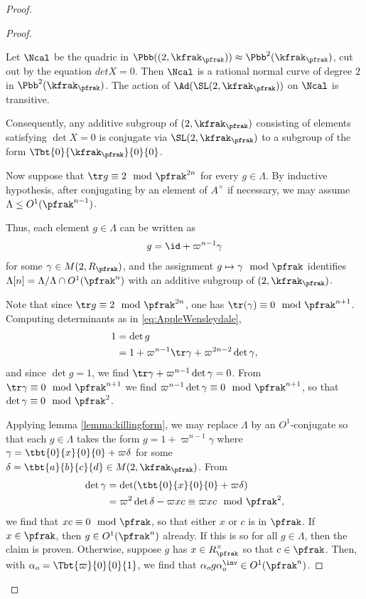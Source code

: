 \begin{proof}
\begin{proof}
  \begin{lemma}\label{lemma:killingform}
    Let $\Ncal$ be the quadric in $\Pbb(\sl(2,\kfrak_\pfrak))\approx \Pbb^2(\kfrak_\pfrak)$, cut out by the equation $det X =0$. Then $\Ncal$ is a rational normal curve of degree $2$ in $\Pbb^2(\kfrak_\pfrak)$. The action of $\Ad(\SL(2,\kfrak_\pfrak))$ on $\Ncal$ is transitive.

    Consequently, any additive subgroup of $\sl(2,\kfrak_\pfrak)$ consisting of elements satisfying $\det X = 0$ is conjugate via $\SL(2,\kfrak_\pfrak)$ to a subgroup of the form $\Tbt{0}{\kfrak_\pfrak}{0}{0}$.
  \end{lemma}
  Now suppose that $\tr g \equiv 2 \mod \pfrak^{2n}$ for every $g\in \Lambda$. By inductive hypothesis, after conjugating by an element of $A^\times$ if necessary, we may assume $\Lambda \leq O^1(\pfrak^{n-1})$.

  Thus, each element $g\in \Lambda$ can be written as
  \begin{align}\label{eq:AppleWensleydale}
    g = \id +\varpi^{n-1} \gamma
  \end{align}
  for some $\gamma \in M(2, R_\pfrak)$, and the assignment $g \mapsto \gamma \mod \pfrak$ identifies $\Lambda[n] = \Lambda /\Lambda \cap O^1(\pfrak^n)$ with an additive subgroup of $\sl(2,\kfrak_\pfrak)$.

  Note that since $\tr g \equiv 2 \mod \pfrak^{2n}$, one has $\tr(\gamma) \equiv 0 \mod \pfrak^{n+1}$.
  Computing determinants as in \ref{eq:AppleWensleydale},
  \begin{align*}
    1 & = \det g                                                  \\
      & = 1 + \varpi^{n-1} \tr \gamma + \varpi^{2n-2}\det \gamma,
  \end{align*}
  and since $\det g =1$, we find $\tr \gamma +\varpi^{n-1}\det \gamma =0$. From $\tr \gamma  \equiv 0 \mod \pfrak^{n+1}$ we find $ \varpi^{n-1}\det \gamma \equiv 0 \mod \pfrak^{n+1}$, so that $\det \gamma \equiv 0 \mod \pfrak^2$.

  Applying lemma \ref{lemma:killingform}, we may replace $\Lambda$ by an $O^1$-conjugate so that each $g \in \Lambda$ takes the form $g = 1 + \varpi^{n-1}\gamma$ where $\gamma = \tbt{0}{x}{0}{0} +\varpi\delta$ for some $\delta =\tbt{a}{b}{c}{d} \in M(2,\kfrak_\pfrak)$. From
  \begin{align*}
    \det \gamma & = \det (\tbt{0}{x}{0}{0} +\varpi\delta)                              \\
                & = \varpi^2 \det \delta - \varpi x c  \equiv \varpi xc \mod \pfrak^2,
  \end{align*}
  we find that $xc \equiv 0 \mod \pfrak$, so that either $x$ or $c$ is in $\pfrak$. If $x\in \pfrak$, then $g \in O^1(\pfrak^n)$ already. If this is so for all $g \in \Lambda$, then the claim is proven. Otherwise, suppose $g$ has $x \in R_\pfrak^\times$ so that $c \in \pfrak$. Then, with $\alpha_o = \Tbt{\varpi}{0}{0}{1}$, we find that $\alpha_o g \alpha_o^\inv \in O^1(\pfrak^n)$.


\end{proof}
\end{proof}
